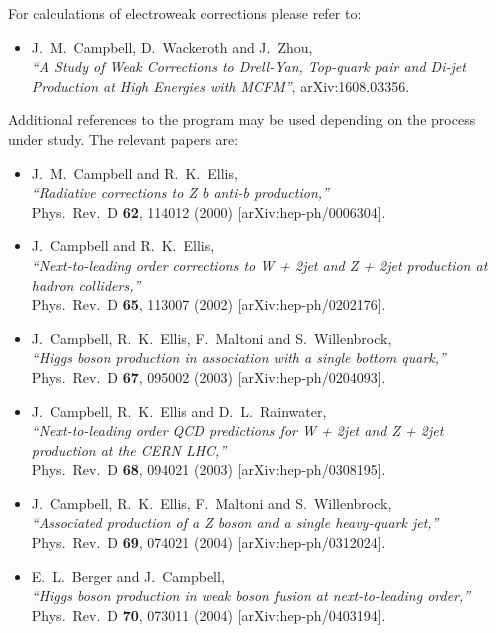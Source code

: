 \documentclass{article}
\begin{document}
{{{{{{For calculations of electroweak corrections please refer to:
\begin{itemize}
\item
  J.~M.~Campbell, D.~Wackeroth and J.~Zhou, \\
  {\it ``A Study of Weak Corrections to Drell-Yan, Top-quark pair and Di-jet
  Production at High Energies with MCFM''},
  arXiv:1608.03356.
\end{itemize}

Additional references to the program may be used depending on the process under study. The relevant papers are:
\begin{itemize}
\item J.~M.~Campbell and R.~K.~Ellis, \\
  {\it ``Radiative corrections to Z b anti-b production,''} \\
  Phys.\ Rev.\ D {\bf 62}, 114012 (2000)
  [arXiv:hep-ph/0006304].
\item J.~Campbell and R.~K.~Ellis, \\
  {\it ``Next-to-leading order corrections to W + 2jet and Z + 2jet production  at
   hadron colliders,''} \\
  Phys.\ Rev.\ D {\bf 65}, 113007 (2002)
  [arXiv:hep-ph/0202176].
\item J.~Campbell, R.~K.~Ellis, F.~Maltoni and S.~Willenbrock, \\
  {\it ``Higgs boson production in association with a single bottom quark,''} \\
  Phys.\ Rev.\ D {\bf 67}, 095002 (2003)
  [arXiv:hep-ph/0204093].
\item J.~Campbell, R.~K.~Ellis and D.~L.~Rainwater, \\
  {\it ``Next-to-leading order QCD predictions for W + 2jet and Z + 2jet  production
     at the CERN LHC,''} \\
  Phys.\ Rev.\ D {\bf 68}, 094021 (2003)
  [arXiv:hep-ph/0308195].
\item J.~Campbell, R.~K.~Ellis, F.~Maltoni and S.~Willenbrock, \\
  {\it ``Associated production of a Z boson and a single heavy-quark jet,''} \\
  Phys.\ Rev.\ D {\bf 69}, 074021 (2004)
  [arXiv:hep-ph/0312024].
\item E.~L.~Berger and J.~Campbell, \\
  {\it ``Higgs boson production in weak boson fusion at next-to-leading order,''} \\
  Phys.\ Rev.\ D {\bf 70}, 073011 (2004)
  [arXiv:hep-ph/0403194].

\end{itemize}}}}}}}
\end{document}
